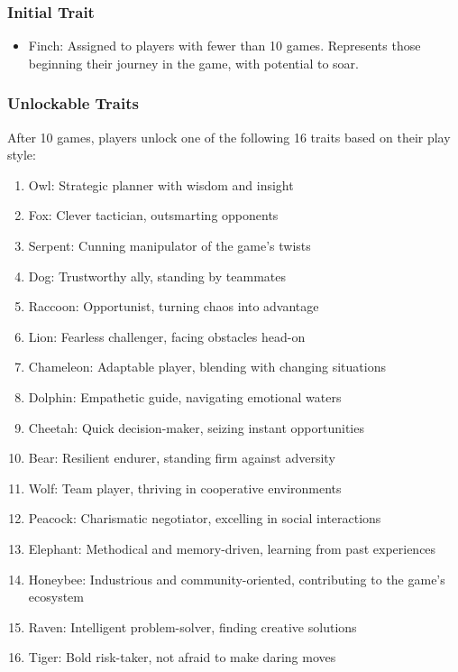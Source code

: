 \documentclass[]{article}
\begin{document}
\hypertarget{initial-trait}{%
\subsubsection{Initial Trait}\label{initial-trait}}

\begin{itemize}
\tightlist
\item
  Finch: Assigned to players with fewer than 10 games. Represents those
  beginning their journey in the game, with potential to soar.
\end{itemize}

\hypertarget{unlockable-traits}{%
\subsubsection{Unlockable Traits}\label{unlockable-traits}}

After 10 games, players unlock one of the following 16 traits based on
their play style:

\begin{enumerate}
\def\labelenumi{\arabic{enumi}.}
\tightlist
\item
  Owl: Strategic planner with wisdom and insight
\item
  Fox: Clever tactician, outsmarting opponents
\item
  Serpent: Cunning manipulator of the game's twists
\item
  Dog: Trustworthy ally, standing by teammates
\item
  Raccoon: Opportunist, turning chaos into advantage
\item
  Lion: Fearless challenger, facing obstacles head-on
\item
  Chameleon: Adaptable player, blending with changing situations
\item
  Dolphin: Empathetic guide, navigating emotional waters
\item
  Cheetah: Quick decision-maker, seizing instant opportunities
\item
  Bear: Resilient endurer, standing firm against adversity
\item
  Wolf: Team player, thriving in cooperative environments
\item
  Peacock: Charismatic negotiator, excelling in social interactions
\item
  Elephant: Methodical and memory-driven, learning from past experiences
\item
  Honeybee: Industrious and community-oriented, contributing to the
  game's ecosystem
\item
  Raven: Intelligent problem-solver, finding creative solutions
\item
  Tiger: Bold risk-taker, not afraid to make daring moves
\end{enumerate}
\end{document}
